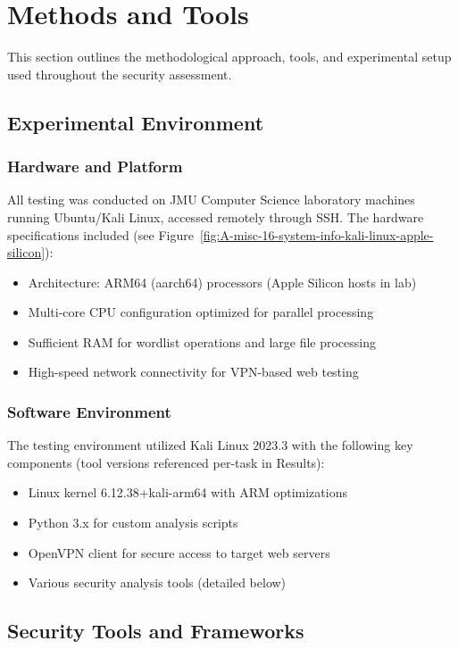 \section{Methods and Tools}

This section outlines the methodological approach, tools, and experimental setup used throughout the security assessment.

\subsection{Experimental Environment}

\subsubsection{Hardware and Platform}
All testing was conducted on JMU Computer Science laboratory machines running Ubuntu/Kali Linux, accessed remotely through SSH. The hardware specifications included (see Figure~\ref{fig:A-misc-16-system-info-kali-linux-apple-silicon}):
\begin{itemize}
    \item Architecture: ARM64 (aarch64) processors (Apple Silicon hosts in lab)
    \item Multi-core CPU configuration optimized for parallel processing
    \item Sufficient RAM for wordlist operations and large file processing
    \item High-speed network connectivity for VPN-based web testing
\end{itemize}

\subsubsection{Software Environment}
The testing environment utilized Kali Linux 2023.3 with the following key components (tool versions referenced per-task in Results):
\begin{itemize}
    \item Linux kernel 6.12.38+kali-arm64 with ARM optimizations
    \item Python 3.x for custom analysis scripts
    \item OpenVPN client for secure access to target web servers
    \item Various security analysis tools (detailed below)
\end{itemize}

\subsection{Security Tools and Frameworks}

